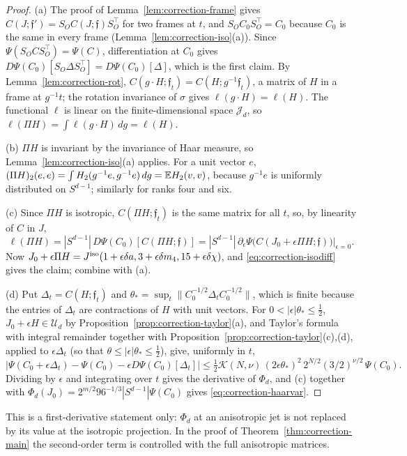 \begin{proof}
(a) The proof of Lemma~\ref{lem:correction-frame} gives $C(J;\mathfrak f')=S_OC(J;\mathfrak f)S_O^{\top}$ for two frames at $t$, and $S_OC_0S_O^{\top}=C_0$ because $C_0$ is the same in every frame (Lemma~\ref{lem:correction-iso}(a)). Since $\Psi(S_OCS_O^{\top})=\Psi(C)$, differentiation at $C_0$ gives $D\Psi(C_0)[S_O\Delta S_O^{\top}]=D\Psi(C_0)[\Delta]$, which is the first claim. By Lemma~\ref{lem:correction-rot}, $C(g\cdot H;\mathfrak f_t)=C(H;g^{-1}\mathfrak f_t)$, a matrix of $H$ in a frame at $g^{-1}t$; the rotation invariance of $\sigma$ gives $\ell(g\cdot H)=\ell(H)$. The functional $\ell$ is linear on the finite-dimensional space $\mathcal J_d$, so $\ell(\Pi H)=\int\ell(g\cdot H)\,dg=\ell(H)$.

(b) $\Pi H$ is invariant by the invariance of Haar measure, so Lemma~\ref{lem:correction-iso}(a) applies. For a unit vector $e$, $(\Pi H)_2(e,e)=\int H_2(g^{-1}e,g^{-1}e)\,dg=\mathbb E H_2(v,v)$, because $g^{-1}e$ is uniformly distributed on $S^{d-1}$; similarly for ranks four and six.

(c) Since $\Pi H$ is isotropic, $C(\Pi H;\mathfrak f_t)$ is the same matrix for all $t$, so, by linearity of $C$ in $J$,
\[
\ell(\Pi H)=|S^{d-1}|\,D\Psi(C_0)[C(\Pi H;\mathfrak f)]=|S^{d-1}|\,\partial_\epsilon\Psi\bigl(C(J_0+\epsilon\Pi H;\mathfrak f)\bigr)\big|_{\epsilon=0}.
\]
Now $J_0+\epsilon\Pi H=J^{\rm iso}(1+\epsilon\delta a,3+\epsilon\delta m_4,15+\epsilon\delta\chi)$, and \eqref{eq:correction-isodiff} gives the claim; combine with (a).

(d) Put $\Delta_t=C(H;\mathfrak f_t)$ and $\theta_*=\sup_t\|C_0^{-1/2}\Delta_tC_0^{-1/2}\|$, which is finite because the entries of $\Delta_t$ are contractions of $H$ with unit vectors. For $0<|\epsilon|\theta_*\le\frac12$, $J_0+\epsilon H\in\mathcal U_d$ by Proposition~\ref{prop:correction-taylor}(a), and Taylor's formula with integral remainder together with Proposition~\ref{prop:correction-taylor}(c),(d), applied to $\epsilon\Delta_t$ (so that $\theta\le|\epsilon|\theta_*\le\frac12$), give, uniformly in $t$,
\[
\bigl|\Psi(C_0+\epsilon\Delta_t)-\Psi(C_0)-\epsilon D\Psi(C_0)[\Delta_t]\bigr|\le\tfrac12\mathcal K(N,\nu)\,(2\epsilon\theta_*)^2\,2^{N/2}(3/2)^{\nu/2}\,\Psi(C_0).
\]
Dividing by $\epsilon$ and integrating over $t$ gives the derivative of $\Phi_d$, and (c) together with $\Phi_d(J_0)=2^{m/2}96^{-1/3}|S^{d-1}|\Psi(C_0)$ gives \eqref{eq:correction-haarvar}.
\end{proof}

This is a first-derivative statement only: $\Phi_d$ at an anisotropic jet is not replaced by its value at the isotropic projection. In the proof of Theorem~\ref{thm:correction-main} the second-order term is controlled with the full anisotropic matrices.

